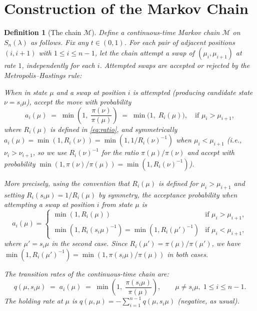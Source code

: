 \documentclass[12pt]{article}
\newtheorem{definition}[theorem]{Definition}
\begin{document}
\section{Construction of the Markov Chain}

\begin{definition}[The chain $\mathcal{M}$]\label{def:chain}
Define a continuous-time Markov chain $\mathcal{M}$ on $S_n(\lambda)$ as follows. Fix any $t \in (0,1)$. For each pair of adjacent positions $(i, i+1)$ with $1 \leq i \leq n-1$, let the chain attempt a swap of $(\mu_i, \mu_{i+1})$ at rate $1$, independently for each $i$. Attempted swaps are accepted or rejected by the Metropolis--Hastings rule:

When in state $\mu$ and a swap at position $i$ is attempted (producing candidate state $\nu = s_i\mu$), accept the move with probability
\begin{equation}\label{eq:accept}
a_i(\mu) \;=\; \min\!\left(1,\; \frac{\pi(\nu)}{\pi(\mu)}\right) \;=\; \min\bigl(1,\; R_i(\mu)\bigr), \quad \text{if } \mu_i > \mu_{i+1},
\end{equation}
where $R_i(\mu)$ is defined in \eqref{eq:ratio}, and symmetrically $a_i(\mu) = \min(1, R_i(\nu)) = \min(1, 1/R_i(\nu)^{-1})$ when $\mu_i < \mu_{i+1}$ (i.e., $\nu_i > \nu_{i+1}$, so we use $R_i(\nu)^{-1}$ for the ratio $\pi(\mu)/\pi(\nu)$ and accept with probability $\min(1, \pi(\nu)/\pi(\mu)) = \min(1, R_i(\nu)^{-1})$).

More precisely, using the convention that $R_i(\mu)$ is defined for $\mu_i > \mu_{i+1}$ and setting $R_i(s_i\mu) = 1/R_i(\mu)$ by symmetry, the acceptance probability when attempting a swap at position $i$ from state $\mu$ is
\[
a_i(\mu) = \begin{cases}
\min(1, R_i(\mu)) & \text{if } \mu_i > \mu_{i+1},\\
\min(1, R_i(s_i\mu)^{-1}) = \min(1, R_i(\mu')^{-1}) & \text{if } \mu_i < \mu_{i+1},
\end{cases}
\]
where $\mu' = s_i\mu$ in the second case. Since $R_i(\mu') = \pi(\mu)/\pi(\mu')$, we have $\min(1,R_i(\mu')^{-1}) = \min(1,\pi(s_i\mu)/\pi(\mu))$ in both cases.

The \emph{transition rates} of the continuous-time chain are:
\begin{equation}\label{eq:rates}
q(\mu, s_i\mu) \;=\; a_i(\mu) \;=\; \min\!\left(1,\;\frac{\pi(s_i\mu)}{\pi(\mu)}\right), \qquad \mu \neq s_i\mu,\; 1 \leq i \leq n-1.
\end{equation}
The holding rate at $\mu$ is $q(\mu,\mu) = -\sum_{i=1}^{n-1} q(\mu, s_i\mu)$ (negative, as usual).
\end{definition}
\end{document}

